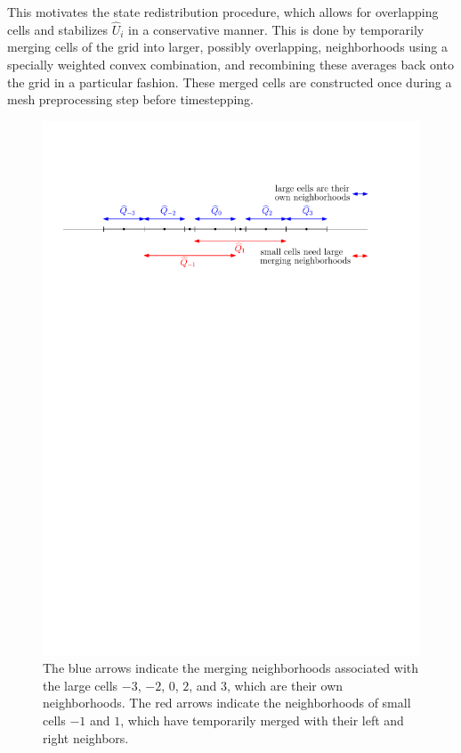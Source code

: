 This motivates the state redistribution
procedure, which allows for overlapping cells and stabilizes 
$\widehat{U}_i$ in a conservative manner.
This is done by temporarily merging cells of the grid into 
larger, possibly overlapping, neighborhoods using a specially weighted 
convex combination, and recombining these averages back onto the
grid in a particular fashion.  These merged cells are 
constructed once during a mesh preprocessing step before timestepping.

\begin{figure}[h]
\begin{center}
\vspace*{.1in}
\includegraphics[width=0.75\linewidth]{figs/overlapping1.pdf} 
\caption{\sf 
The blue arrows indicate the merging neighborhoods associated with the large 
cells $-3$, $-2$, $0$, $2$, and $3$, which are their own neighborhoods.  
The red arrows indicate the neighborhoods of small cells $-1$ and $1$, which
have temporarily merged with their left and right neighbors.  
\label{fig:mn1}}
\end{center}
\end{figure}


